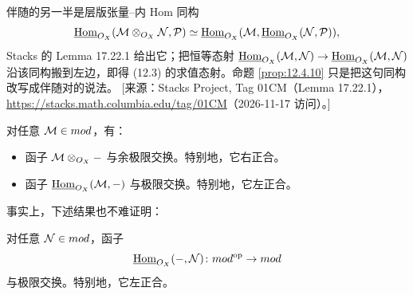 \begin{yizhu}
伴随的另一半是层版张量–内 Hom 同构
\[
\underline{\mathrm{Hom}}_{O_X}(\mathcal{M}\otimes_{O_X}\mathcal{N},\mathcal{P})\simeq\underline{\mathrm{Hom}}_{O_X}(\mathcal{M},\underline{\mathrm{Hom}}_{O_X}(\mathcal{N},\mathcal{P})),
\]
Stacks 的 Lemma 17.22.1 给出它；把恒等态射 $\underline{\mathrm{Hom}}_{O_X}(\mathcal{M},\mathcal{N})\to\underline{\mathrm{Hom}}_{O_X}(\mathcal{M},\mathcal{N})$ 沿该同构搬到左边，即得 (12.3) 的求值态射。命题 \ref{prop:12.4.10} 只是把这句同构改写成伴随对的说法。
[来源：Stacks Project, Tag 01CM（Lemma 17.22.1），\url{https://stacks.math.columbia.edu/tag/01CM}（2026-11-17 访问）。]
\end{yizhu}

\begin{corollary}\label{cor:12.4.11}
对任意 $\mathcal{M}\in mod$，有：
\begin{itemize}
  \item 函子 $\mathcal{M}\otimes_{O_X}-$ 与余极限交换。特别地，它右正合。
  \item 函子 $\underline{\mathrm{Hom}}_{O_X}(\mathcal{M},-)$ 与极限交换。特别地，它左正合。
\end{itemize}
\end{corollary}

事实上，下述结果也不难证明：

\begin{lemma}\label{lem:12.4.12}
对任意 $\mathcal{N}\in mod$，函子
\[
\underline{\mathrm{Hom}}_{O_X}(-,\mathcal{N})\colon mod^{\mathrm{op}}\to mod
\]
与极限交换。特别地，它左正合。
\end{lemma}
